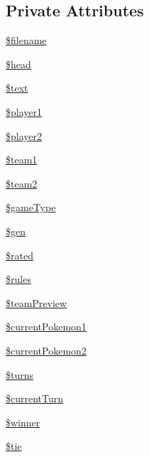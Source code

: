 \subsection*{Private Attributes}
\begin{DoxyCompactItemize}
\item 
\hyperlink{class_replay_parser_a3bab09a22a017510df85385c93d1bb73}{\$filename}
\item 
\hyperlink{class_replay_parser_a99e459cf689bf6b020a97d5e69058ad2}{\$head}
\item 
\hyperlink{class_replay_parser_a4919d083ff3ae06c9fad521dd88f3e86}{\$text}
\item 
\hyperlink{class_replay_parser_a58fa8ca159fee6190963317feb32b88a}{\$player1}
\item 
\hyperlink{class_replay_parser_a9fd166f3321f2a7454a4ad4ab2da1baa}{\$player2}
\item 
\hyperlink{class_replay_parser_a27e6e02e6209238b375e7feadd919be6}{\$team1}
\item 
\hyperlink{class_replay_parser_ac3eaf741c19a822ded2c0f61b1dbbc11}{\$team2}
\item 
\hyperlink{class_replay_parser_ac08656a3b68fa47da8c2004daf65f7e2}{\$game\+Type}
\item 
\hyperlink{class_replay_parser_a598834be544c3f7bd60181ea3b74b60e}{\$gen}
\item 
\hyperlink{class_replay_parser_a34125e6fe18fb27133a4b6d48d966518}{\$rated}
\item 
\hyperlink{class_replay_parser_a6bc76372536e47823d0c07db1aba0590}{\$rules}
\item 
\hyperlink{class_replay_parser_a47feabfeecd0f607b051d5419a3b40b1}{\$team\+Preview}
\item 
\hyperlink{class_replay_parser_acc9cf33983be8e86ae07c700b36c7d7c}{\$current\+Pokemon1}
\item 
\hyperlink{class_replay_parser_ad033676bf59d16af82bc81c352b497e2}{\$current\+Pokemon2}
\item 
\hyperlink{class_replay_parser_a6d363e2d103e17e79c771a233d7a81d7}{\$turns}
\item 
\hyperlink{class_replay_parser_a8a68290aa1cbbdc77859e5725e3344b6}{\$current\+Turn}
\item 
\hyperlink{class_replay_parser_ac14a4357e1a358f78366bba4fa69f75f}{\$winner}
\item 
\hyperlink{class_replay_parser_a1ed74806a3d21cd515f4a00b971178b5}{\$tie}
\end{DoxyCompactItemize}


